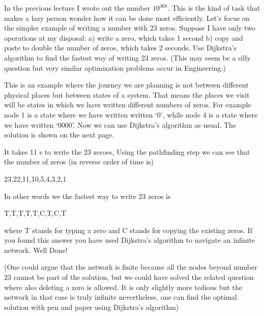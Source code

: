 
In the previous lecture I wrote out the number $10^{368}$. This is the kind of task that makes a lazy person wonder how it can be done most efficiently.
Let's focus on the simpler example of writing a number with 23 zeros. Suppose I have only two operations at my disposal: a) write a zero, which takes 1 second b) copy and paste to double the number of zeros, which takes 2 seconds. Use Dijkstra's algorithm to find the fastest way of writing 23 zeros. (This may seem be a silly question but very similar optimization problems occur in Engineering.) 

\solution
This is an  example where the journey we are planning is not between different physical places but between states of a system. That means the places we visit will be states in which we have written different numbers of zeros. For example node 1 is a state where we have written written `0', while node 4 is a state where we have written `0000'. Now we can use Dijkstra's algorithm as usual. The solution is shown on the next page.

It takes 11 s to write the 23 zeroes, Using the pathfinding step we can see that the number of zeros (in reverse order of time is)
\begin{center}
23,22,11,10,5,4,3,2,1 
\end{center}
In other words we the fastest way to write 23 zeros is
\begin{center}
T,T,T,T,T,C,T,C,T
\end{center}
where T stands for typing a zero and C stands for copying the existing zeros. If you found this answer you have used Dijkstra's algorithm to navigate an infinite network. Well Done! 

(One could argue that the network is finite because all the nodes beyond number 23 cannot be part of the solution, but we could have solved the related question where also deleting a zero is allowed. It is only slightly more tedious but the network in that case is truly infinite nevertheless, one can find the optimal solution with pen and paper using Dijkstra's algorithm)

